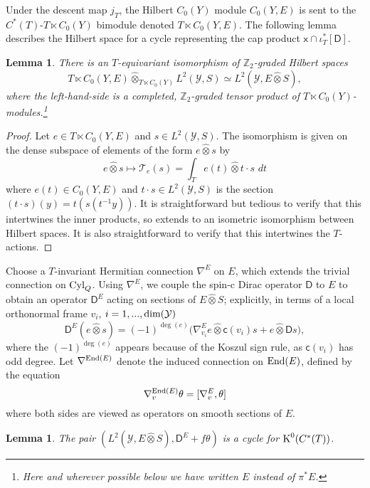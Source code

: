 \documentclass[11pt,reqno]{amsart}
\newtheorem{lemma}[theorem]{Lemma}
\theoremstyle{definition}
\theoremstyle{remark}
\newcommand{\wh}[1]{\widehat{#1}}
\newcommand{\st}[1]{\mathsf{#1}}
\def\T{\ensuremath{\mathcal{T}}}
\def\Y{\ensuremath{\mathcal{Y}}}
\def\K{\ensuremath{\mathcal{K}}}
\def\c{\ensuremath{\mathsf{c}}}
\def\bZ{\ensuremath{\mathbb{Z}}}
\def\End{\ensuremath{\textnormal{End}}}
\def\dim{\ensuremath{\textnormal{dim}}}
\def\K{\ensuremath{\textnormal{K}}}
\def\Cyl{\ensuremath{\textnormal{Cyl}}}
\begin{document}
Under the descent map $j_T$, the Hilbert $C_0(Y)$ module $C_0(Y,E)$ is sent to the $C^\ast(T)$-$T\ltimes C_0(Y)$ bimodule denoted $T \ltimes C_0(Y,E)$.  The following lemma describes the Hilbert space for a cycle representing the cap product $\st{x}\cap \iota_T^\ast [\st{D}]$.
\begin{lemma}
\label{LemmaHilbSpace}
There is an $T$-equivariant isomorphism of $\bZ_2$-graded Hilbert spaces
\[ T\ltimes C_0(Y,E) \wh{\otimes}_{T\ltimes C_0(Y)} L^2(\Y,S) \simeq L^2(\Y,E \wh{\otimes} S),\]
where the left-hand-side is a completed, $\bZ_2$-graded tensor product of $T \ltimes C_0(Y)$-modules.\footnote{Here and wherever possible below we have written $E$ instead of $\pi^\ast E$.}
\end{lemma}
\begin{proof}
Let $e \in T \ltimes C_0(Y,E)$ and $s \in L^2(\Y,S)$.  The isomorphism is given on the dense subspace of elements of the form $e\wh{\otimes} s$ by
\[ e \wh{\otimes} s \mapsto \T_e(s)= \int_T e(t)\wh{\otimes} t\cdot s \,\,dt \]
where $e(t) \in C_0(Y,E)$ and $t\cdot s \in L^2(\Y,S)$ is the section $(t\cdot s)(y)=t(s(t^{-1}y))$.  It is straightforward but tedious to verify that this intertwines the inner products, so extends to an isometric isomorphism between Hilbert spaces.  It is also straightforward to verify that this intertwines the $T$-actions.
\end{proof}
Choose a $T$-invariant Hermitian connection $\nabla^E$ on $E$, which extends the trivial connection on $\Cyl_Q$.  Using $\nabla^E$, we couple the spin-c Dirac operator $\st{D}$ to $E$ to obtain an operator $\st{D}^E$ acting on sections of $E\wh{\otimes} S$; explicitly, in terms of a local orthonormal frame $v_i$, $i=1,...,\dim(\Y)$
\[ \st{D}^E(e\wh{\otimes} s)=(-1)^{\deg(e)}\big(\nabla^E_{v_i}e\wh{\otimes} \c(v_i)s+e\wh{\otimes} \st{D}s\big),\]
where the $(-1)^{\deg(e)}$ appears because of the Koszul sign rule, as $\c(v_i)$ has odd degree.  Let $\nabla^{\End(E)}$ denote the induced connection on $\End(E)$, defined by the equation
\[ \nabla^{\End(E)}_v\theta=[\nabla^E_v,\theta]\]
where both sides are viewed as operators on smooth sections of $E$.
\begin{lemma}
\label{lem:KKcycle}
The pair $(L^2(\Y,E\wh{\otimes} S),\st{D}^E+f\theta)$ is a cycle for $\K^0(C^\ast(T))$. 
\end{lemma}
\end{document}
